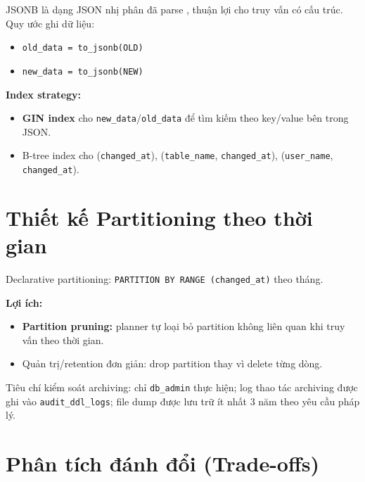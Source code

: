 JSONB là dạng JSON nhị phân đã parse \cite{PG16JSONB}, thuận lợi cho truy vấn có cấu trúc. Quy ước ghi dữ liệu:
\begin{itemize}
    \item \texttt{old\_data = to\_jsonb(OLD)}
    \item \texttt{new\_data = to\_jsonb(NEW)}
\end{itemize}

\textbf{Index strategy:}
\begin{itemize}
    \item \textbf{GIN index} \cite{PG16GIN} cho \texttt{new\_data}/\texttt{old\_data} để tìm kiếm theo key/value bên trong JSON.
    \item \begin{sloppypar}B-tree index cho (\texttt{changed\_at}), (\texttt{table\_name}, \texttt{changed\_at}), (\texttt{user\_name}, \texttt{changed\_at}).\end{sloppypar}
\end{itemize}

\section{Thiết kế Partitioning theo thời gian}

Declarative partitioning: \texttt{PARTITION\ BY\ RANGE\ (changed\_at)} \cite{PG16Partitioning} theo tháng.

\textbf{Lợi ích:}
\begin{itemize}
    \item \textbf{Partition pruning:} planner tự loại bỏ partition không liên quan khi truy vấn theo thời gian.
    \item Quản trị/retention đơn giản: drop partition thay vì delete từng dòng.
\end{itemize}

Tiêu chí kiểm soát archiving: chỉ \texttt{db\_admin} thực hiện; log thao tác archiving được ghi vào \texttt{audit\_ddl\_logs}; file dump được lưu trữ ít nhất 3 năm theo yêu cầu pháp lý.

\clearpage
\section{Phân tích đánh đổi (Trade-offs)}

